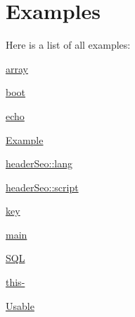 \section{Examples}
Here is a list of all examples\-:\begin{DoxyCompactItemize}
\item 
\hyperlink{array-example}{array}
\item 
\hyperlink{boot-example}{boot}
\item 
\hyperlink{echo-example}{echo}
\item 
\hyperlink{_example-example}{Example}
\item 
\hyperlink{header_seo_1_1lang-example}{header\-Seo\-::lang}
\item 
\hyperlink{header_seo_1_1script-example}{header\-Seo\-::script}
\item 
\hyperlink{key-example}{key}
\item 
\hyperlink{main-example}{main}
\item 
\hyperlink{_s_q_l-example}{S\-Q\-L}
\item 
\hyperlink{this--example}{this-\/}
\item 
\hyperlink{_usable-example}{Usable}
\end{DoxyCompactItemize}
